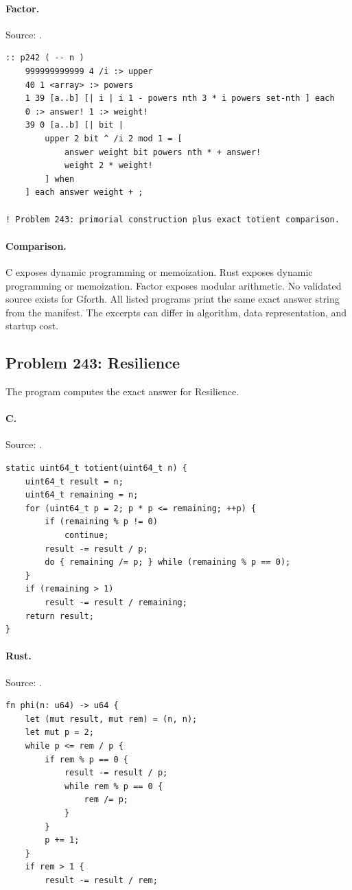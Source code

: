 \paragraph{Factor.} Source: .
\begin{lstlisting}
:: p242 ( -- n )
    999999999999 4 /i :> upper
    40 1 <array> :> powers
    1 39 [a..b] [| i | i 1 - powers nth 3 * i powers set-nth ] each
    0 :> answer! 1 :> weight!
    39 0 [a..b] [| bit |
        upper 2 bit ^ /i 2 mod 1 = [
            answer weight bit powers nth * + answer!
            weight 2 * weight!
        ] when
    ] each answer weight + ;

! Problem 243: primorial construction plus exact totient comparison.
\end{lstlisting}

\paragraph{Comparison.}
C exposes dynamic programming or memoization. Rust exposes dynamic programming or memoization. Factor exposes modular arithmetic.
No validated source exists for Gforth.
All listed programs print the same exact answer string from the manifest. The excerpts can differ in algorithm, data representation, and startup cost.

\subsection{Problem 243: Resilience}
\label{walkthrough:p243}
The program computes the exact answer for Resilience.

\paragraph{C.} Source: .
\begin{lstlisting}
static uint64_t totient(uint64_t n) {
    uint64_t result = n;
    uint64_t remaining = n;
    for (uint64_t p = 2; p * p <= remaining; ++p) {
        if (remaining % p != 0)
            continue;
        result -= result / p;
        do { remaining /= p; } while (remaining % p == 0);
    }
    if (remaining > 1)
        result -= result / remaining;
    return result;
}
\end{lstlisting}

\paragraph{Rust.} Source: .
\begin{lstlisting}
fn phi(n: u64) -> u64 {
    let (mut result, mut rem) = (n, n);
    let mut p = 2;
    while p <= rem / p {
        if rem % p == 0 {
            result -= result / p;
            while rem % p == 0 {
                rem /= p;
            }
        }
        p += 1;
    }
    if rem > 1 {
        result -= result / rem;
\end{lstlisting}

